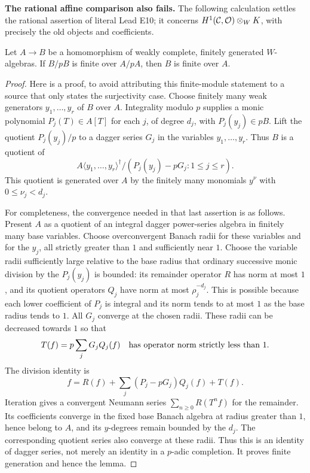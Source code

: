 \par\smallskip\noindent\textbf{The rational affine comparison also fails.}
The following calculation settles the rational assertion of literal Lead E10; it concerns $H^1(\mathcal C,\mathcal O)\otimes_WK$, with precisely the old objects and coefficients.

\begin{lemma}\label{lem:DE-weak-finite}
Let $A\to B$ be a homomorphism of weakly complete, finitely generated $W$-algebras.  If $B/pB$ is finite over $A/pA$, then $B$ is finite over $A$.
\end{lemma}
\begin{proof}
Here is a proof, to avoid attributing this finite-module statement to a source that only states the surjectivity case.  Choose finitely many weak generators $y_1,\ldots,y_r$ of $B$ over $A$.  Integrality modulo $p$ supplies a monic polynomial $P_j(T)\in A[T]$ for each $j$, of degree $d_j$, with $P_j(y_j)\in pB$.  Lift the quotient $P_j(y_j)/p$ to a dagger series $G_j$ in the variables $y_1,\ldots,y_r$.  Thus $B$ is a quotient of
\[
 A\langle y_1,\ldots,y_r\rangle^\dagger/
       (P_j(y_j)-pG_j:1\leq j\leq r).
\]
This quotient is generated over $A$ by the finitely many monomials $y^\nu$ with $0\leq\nu_j<d_j$.

For completeness, the convergence needed in that last assertion is as follows.  Present $A$ as a quotient of an integral dagger power-series algebra in finitely many base variables.  Choose overconvergent Banach radii for these variables and for the $y_j$, all strictly greater than $1$ and sufficiently near $1$.  Choose the variable radii sufficiently large relative to the base radius that ordinary successive monic division by the $P_j(y_j)$ is bounded: its remainder operator $R$ has norm at most $1$, and its quotient operators $Q_j$ have norm at most $\rho_j^{-d_j}$.  This is possible because each lower coefficient of $P_j$ is integral and its norm tends to at most $1$ as the base radius tends to $1$.  All $G_j$ converge at the chosen radii.  These radii can be decreased towards $1$ so that
\[
             T(f)=p\sum_jG_jQ_j(f)
             \quad\hbox{has operator norm strictly less than }1.
\]
The division identity is
\[
 f=R(f)+\sum_j(P_j-pG_j)Q_j(f)+T(f).
\]
Iteration gives a convergent Neumann series $\sum_{n\geq0}R(T^nf)$ for the remainder.  Its coefficients converge in the fixed base Banach algebra at radius greater than $1$, hence belong to $A$, and its $y$-degrees remain bounded by the $d_j$.  The corresponding quotient series also converge at these radii.  Thus this is an identity of dagger series, not merely an identity in a $p$-adic completion.  It proves finite generation and hence the lemma.
\end{proof}

